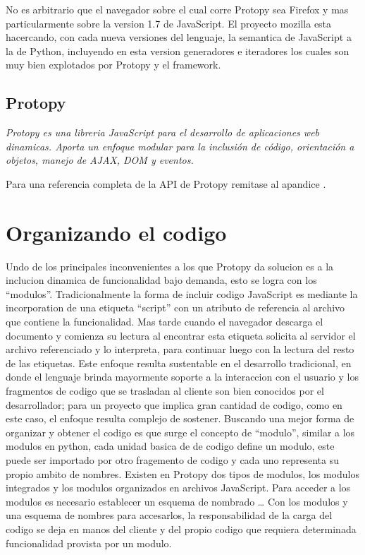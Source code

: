 No es arbitrario que el navegador sobre el cual corre Protopy sea Firefox y
mas particularmente sobre la version 1.7 de JavaScript. El proyecto mozilla
esta hacercando, con cada nueva versiones del lenguaje, la semantica de JavaScript a
la de Python, incluyendo en esta version generadores e iteradores los cuales
son muy bien explotados por Protopy y el framework.

\subsection*{Protopy}
\textit{Protopy es una libreria JavaScript para el desarrollo de aplicaciones
web dinamicas. Aporta un enfoque modular para la inclusión de código,
orientación a objetos, manejo de AJAX, DOM y eventos.}

Para una referencia completa de la API de Protopy remitase al apandice
.

\section{Organizando el codigo}
Undo de los principales inconvenientes a los que Protopy da solucion es a la
inclucion dinamica de funcionalidad bajo demanda, esto se logra con los
``modulos''.
Tradicionalmente la forma de incluir codigo JavaScript es mediante la
incorporation de una etiqueta ``script'' con un atributo de referencia
al archivo que contiene la funcionalidad. Mas tarde cuando el navegador descarga
el documento y comienza su lectura al encontrar esta etiqueta solicita
al servidor el archivo referenciado y lo interpreta, para continuar luego con la
lectura del resto de las etiquetas. Este enfoque resulta sustentable en el
desarrollo tradicional, en donde el lenguaje brinda mayormente soporte a la
interaccion con el usuario y los fragmentos de codigo que se trasladan al
cliente son bien conocidos por el desarrollador; para un proyecto que implica
gran cantidad de codigo, como en este caso, el enfoque resulta complejo de
sostener.
Buscando una mejor forma de organizar y obtener el codigo es que surge el
concepto de ``modulo'', similar a los modulos en python, cada unidad basica de
de codigo define un modulo, este puede ser importado por otro fragemento de
codigo y cada uno representa su propio ambito de nombres. Existen en Protopy
dos tipos de modulos, los modulos integrados y los modulos organizados en
archivos JavaScript.
Para acceder a los modulos es necesario establecer un esquema de nombrado \ldots
Con los modulos y una esquema de nombres para accesarlos, la responsabilidad de
la carga del codigo se deja en manos del cliente y del propio codigo que
requiera determinada funcionalidad provista por un modulo.

